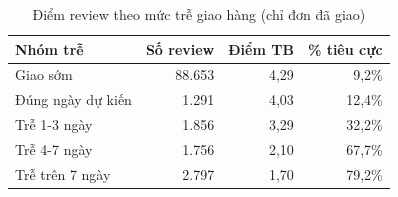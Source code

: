\begin{table}[htbp]
\centering\small
\caption{Điểm review theo mức trễ giao hàng (chỉ đơn đã giao)}
\label{tab:review-delay}
\begin{tabular}{lrrr}
\toprule
\textbf{Nhóm trễ} & \textbf{Số review} & \textbf{Điểm TB} & \textbf{\% tiêu cực} \\
\midrule
Giao sớm & 88.653 & 4,29 & 9,2\% \\
Đúng ngày dự kiến & 1.291 & 4,03 & 12,4\% \\
Trễ 1-3 ngày & 1.856 & 3,29 & 32,2\% \\
Trễ 4-7 ngày & 1.756 & 2,10 & 67,7\% \\
Trễ trên 7 ngày & 2.797 & 1,70 & 79,2\% \\
\bottomrule
\end{tabular}
\end{table}
